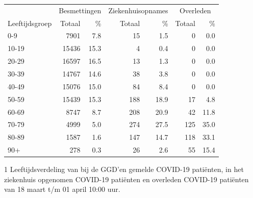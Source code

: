 \documentclass[
  english,
  man,floatsintext]{apa6}
\begin{document}
\begin{table}
\centering\begingroup\fontsize{11}{13}\selectfont

\begin{threeparttable}
\begin{tabular}{lrrrrrr}
\toprule
\multicolumn{1}{c}{ } & \multicolumn{2}{c}{Besmettingen} & \multicolumn{2}{c}{Ziekenhuisopnames} & \multicolumn{2}{c}{Overleden} \\
\cmidrule(l{3pt}r{3pt}){2-3} \cmidrule(l{3pt}r{3pt}){4-5} \cmidrule(l{3pt}r{3pt}){6-7}
Leeftijdsgroep & Totaal & \% & Totaal & \% & Totaal & \%\\
\midrule
0-9 & 7901 & 7.8 & 15 & 1.5 & 0 & 0.0\\
10-19 & 15436 & 15.3 & 4 & 0.4 & 0 & 0.0\\
20-29 & 16597 & 16.5 & 13 & 1.3 & 0 & 0.0\\
30-39 & 14767 & 14.6 & 38 & 3.8 & 0 & 0.0\\
40-49 & 15076 & 15.0 & 84 & 8.4 & 0 & 0.0\\
50-59 & 15439 & 15.3 & 188 & 18.9 & 17 & 4.8\\
60-69 & 8747 & 8.7 & 208 & 20.9 & 42 & 11.8\\
70-79 & 4999 & 5.0 & 274 & 27.5 & 125 & 35.0\\
80-89 & 1587 & 1.6 & 147 & 14.7 & 118 & 33.1\\
90+ & 278 & 0.3 & 26 & 2.6 & 55 & 15.4\\
\bottomrule
\end{tabular}
\begin{tablenotes}
\item[1] Leeftijdsverdeling van bij de GGD’en gemelde COVID-19 patiënten, in het ziekenhuis opgenomen COVID-19 patiënten en overleden COVID-19 patiënten van 18 maart t/m 01 april 10:00 uur.
\end{tablenotes}
\end{threeparttable}
\endgroup{}
\end{table}

\newpage
\end{document}
